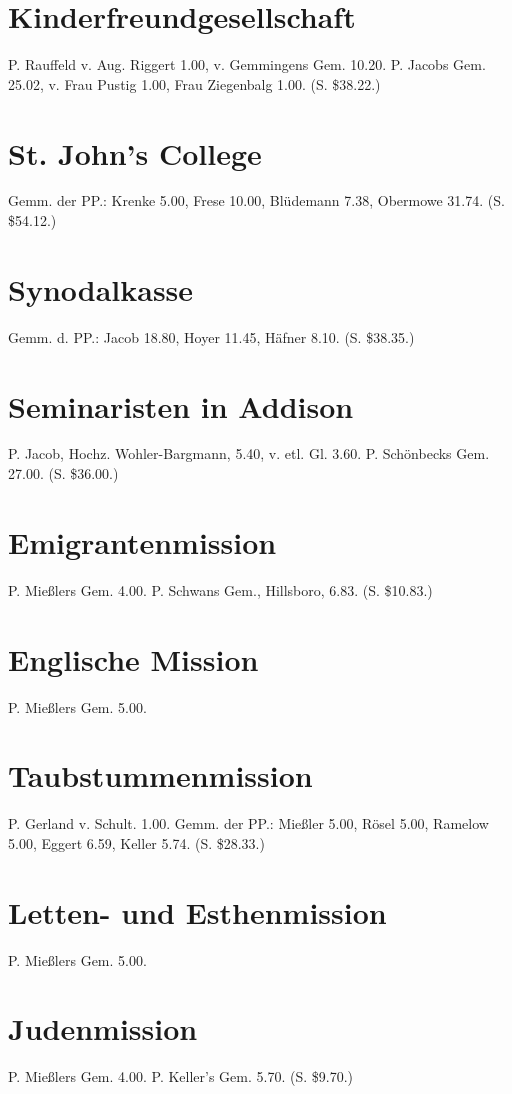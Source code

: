 \section{Kinderfreundgesellschaft}
P. Rauffeld v. Aug. Riggert 1.00, v. Gemmingens Gem. 10.20. P. Jacobs Gem. 25.02, v. Frau Pustig 1.00, Frau Ziegenbalg 1.00. (S. \$38.22.)

\section{St. John’s College}
Gemm. der PP.: Krenke 5.00, Frese 10.00, Blüdemann 7.38, Obermowe 31.74. (S. \$54.12.)

\section{Synodalkasse}
Gemm. d. PP.: Jacob 18.80, Hoyer 11.45, Häfner 8.10. (S. \$38.35.)

\section{Seminaristen in Addison}
P. Jacob, Hochz. Wohler-Bargmann, 5.40, v. etl. Gl. 3.60. P. Schönbecks Gem. 27.00. (S. \$36.00.)

\section{Emigrantenmission}
P. Mießlers Gem. 4.00. P. Schwans Gem., Hillsboro, 6.83. (S. \$10.83.)

\section{Englische Mission}
P. Mießlers Gem. 5.00.

\section{Taubstummenmission}
P. Gerland v. Schult. 1.00. Gemm. der PP.: Mießler 5.00, Rösel 5.00, Ramelow 5.00, Eggert 6.59, Keller 5.74. (S. \$28.33.)

\section{Letten- und Esthenmission}
P. Mießlers Gem. 5.00.

\section{Judenmission}
P. Mießlers Gem. 4.00. P. Keller’s Gem. 5.70. (S. \$9.70.)

